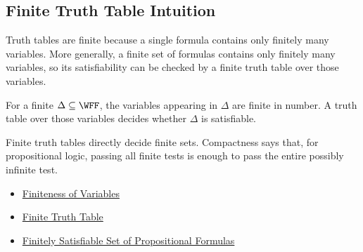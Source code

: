 \subsection*{Finite Truth Table Intuition}

\begin{remark*}
Truth tables are finite because a single formula contains only finitely many
variables. More generally, a finite set of formulas contains only finitely many
variables, so its satisfiability can be checked by a finite truth table over
those variables.
\end{remark*}

\begin{remark*}
For a finite \(\Delta\subseteq\WFF\), the variables appearing in \(\Delta\) are
finite in number. A truth table over those variables decides whether
\(\Delta\) is satisfiable.
\end{remark*}

\begin{remark*}
Finite truth tables directly decide finite sets. Compactness says that, for
propositional logic, passing all finite tests is enough to pass the entire
possibly infinite test.
\end{remark*}

\begin{dependencies}
\begin{itemize}
  \item \hyperref[lem:finiteness-of-variables-propositional-formulas]{Finiteness of Variables}
  \item \hyperref[thm:finite-truth-table-propositional-logic]{Finite Truth Table}
  \item \hyperref[def:finitely-satisfiable-set-of-propositional-formulas]{Finitely Satisfiable Set of Propositional Formulas}
\end{itemize}
\end{dependencies}
